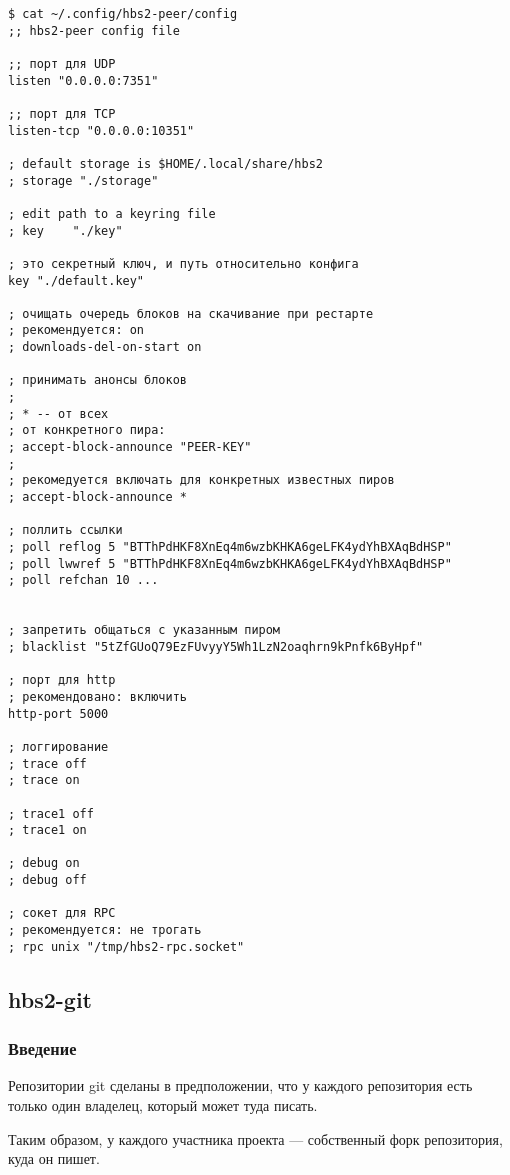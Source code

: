 \documentclass[11pt,a4paper]{article}
\begin{document}
\begin{verbatim}
$ cat ~/.config/hbs2-peer/config
;; hbs2-peer config file

;; порт для UDP
listen "0.0.0.0:7351"

;; порт для TCP
listen-tcp "0.0.0.0:10351"

; default storage is $HOME/.local/share/hbs2
; storage "./storage"

; edit path to a keyring file
; key    "./key"

; это секретный ключ, и путь относительно конфига
key "./default.key"

; очищать очередь блоков на скачивание при рестарте
; рекомендуется: on
; downloads-del-on-start on

; принимать анонсы блоков
;
; * -- от всех
; от конкретного пира:
; accept-block-announce "PEER-KEY"
;
; рекомедуется включать для конкретных известных пиров
; accept-block-announce *

; поллить ссылки
; poll reflog 5 "BTThPdHKF8XnEq4m6wzbKHKA6geLFK4ydYhBXAqBdHSP"
; poll lwwref 5 "BTThPdHKF8XnEq4m6wzbKHKA6geLFK4ydYhBXAqBdHSP"
; poll refchan 10 ...


; запретить общаться с указанным пиром
; blacklist "5tZfGUoQ79EzFUvyyY5Wh1LzN2oaqhrn9kPnfk6ByHpf"

; порт для http
; рекомендовано: включить
http-port 5000

; логгирование
; trace off
; trace on

; trace1 off
; trace1 on

; debug on
; debug off

; сокет для RPC
; рекомендуется: не трогать
; rpc unix "/tmp/hbs2-rpc.socket"

\end{verbatim}

\subsection{hbs2-git}

\subsubsection{Введение}

Репозитории git сделаны в предположении, что у каждого репозитория
есть только один владелец, который может туда писать.

Таким образом, у каждого участника проекта --- собственный форк
репозитория, куда он пишет.
\end{document}
